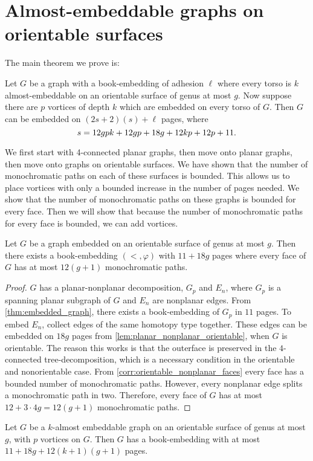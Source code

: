 \section{Almost-embeddable graphs on orientable surfaces}

The main theorem we prove is:
\begin{theorem}\label{thm:orientablevortices}
	Let $G$ be a graph with a book-embedding of adhesion $\ell$ where every torso is $k$ almost-embeddable on an orientable surface of genus at most $g$. Now suppose there are $p$ vortices of depth $k$ which are embedded on every torso of $G$. Then $G$ can be embedded on $(2s + 2)(s) + \ell$ pages, where \[s = 12gpk + 12gp + 18g + 12kp + 12p + 11.\] 
\end{theorem}
We first start with 4-connected planar graphs, then move onto planar graphs, then move onto graphs on orientable surfaces. We have shown that the number of monochromatic paths on each of these surfaces is bounded. This allows us to place vortices with only a bounded increase in the number of pages needed. We show that the number of monochromatic paths on these graphs is bounded for every face. Then we will show that because the number of monochromatic paths for every face is bounded, we can add vortices.

\begin{lemma}\label{lem:orientablesurfaces_monochromatic_edges}
	Let $G$ be a graph embedded on an orientable surface of genus at most $g$. Then there exists a book-embedding $(<, \varphi)$ with $11 + 18g$ pages where every face of $G$ has at most $12(g + 1)$ monochromatic paths.
\end{lemma}
\begin{proof}
	$G$ has a planar-nonplanar decomposition, $G_p$ and $E_n$, where $G_p$ is a spanning planar subgraph of $G$ and $E_n$ are nonplanar edges. From \cref{thm:embedded_graph}, there exists a book-embedding of $G_p$ in $11$ pages. To embed $E_n$, collect edges of the same homotopy type together. These edges can be embedded on $18g$ pages from \cref{lem:planar_nonplanar_orientable}, when $G$ is orientable. The reason this works is that the outerface is preserved in the $4$-connected tree-decomposition, which is a necessary condition in the orientable and nonorientable case.
	From \cref{corr:orientable_nonplanar_faces} every face has a bounded number of monochromatic paths. However, every nonplanar edge splits a monochromatic path in two. Therefore, every face of $G$ has at most $12 + 3 \cdot 4g = 12(g + 1)$ monochromatic paths.
\end{proof}
\begin{lemma}\label{lem:orientablesurfaces_almostembeddable}
	Let $G$ be a $k$-almost embeddable graph on an orientable surface of genus at most $g$, with $p$ vortices on $G$. Then $G$ has a book-embedding with at most $11 + 18g + 12(k + 1)(g + 1)$ pages.
\end{lemma}

